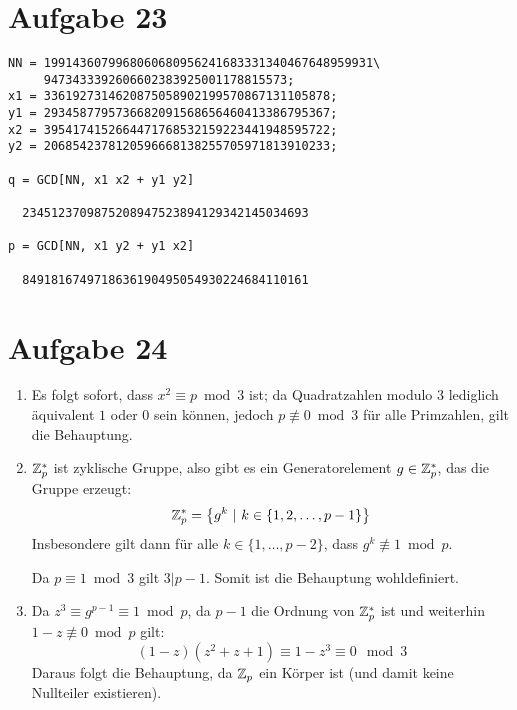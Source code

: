 \section*{Aufgabe 23}
\begin{lstlisting}
NN = 1991436079968060680956241683331340467648959931\
     9473433392606602383925001178815573;
x1 = 3361927314620875058902199570867131105878;
y1 = 2934587795736682091568656460413386795367;
x2 = 3954174152664471768532159223441948595722;
y2 = 2068542378120596668138255705971813910233;

q = GCD[NN, x1 x2 + y1 y2]

  2345123709875208947523894129342145034693

p = GCD[NN, x1 y2 + y1 x2]

  8491816749718636190495054930224684110161
\end{lstlisting}

\section*{Aufgabe 24}
\begin{enumerate}[(1)]
	\item Es folgt sofort, dass $x^2 \equiv p\bmod 3$ ist; da Quadratzahlen
	modulo $3$ lediglich äquivalent $1$ oder $0$ sein können, jedoch $p
	\not\equiv 0\bmod 3$ für alle Primzahlen, gilt die Behauptung.
	
	\item $\mathbb{Z}_p^*$ ist zyklische Gruppe, also gibt es ein Generatorelement
	$g \in \mathbb{Z}_p^*$, das die Gruppe erzeugt:
	\[ \mathbb{Z}_p^* = \left\{g^k\ \vert\ k \in \{1,2,\dots,p-1\}\right\} \]
	Insbesondere gilt dann für alle $k \in \{1,\dots,p-2\}$, dass $g^k
	\not\equiv 1\bmod p$.

	Da $p \equiv 1\bmod 3$ gilt $3 \vert p-1$. Somit ist die Behauptung
	wohldefiniert.

	\item Da $z^3 \equiv g^{p-1} \equiv 1\bmod p$, da $p-1$ die Ordnung von
	$\mathbb{Z}_p^*$ ist und weiterhin $1-z \not\equiv 0\bmod p$ gilt:
	\[ (1-z)(z^2+z+1) \equiv 1-z^3 \equiv 0\mod 3\]
	Daraus folgt die Behauptung, da $\mathbb{Z}_p$ ein Körper ist (und damit keine
	Nullteiler existieren).
\end{enumerate}
